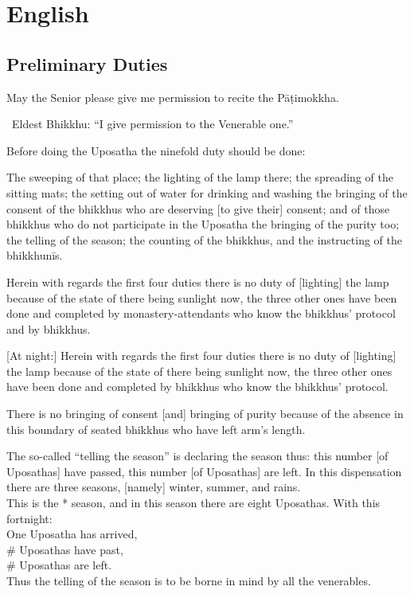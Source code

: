 
\chapter{English}

\clearpage

\section{Preliminary Duties}
\label{preliminary-duties}

\begin{center}
  May the Senior please give me permission to recite the Pāṭimokkha.
\end{center}

\begin{center}
  \anglebracketleft\ \hspace{-0.5mm}Eldest Bhikkhu: ``I give permission to the Venerable one.'' \hspace{-0.5mm}\anglebracketright\
\end{center}

Before doing the Uposatha the ninefold duty should be done:

The sweeping of that place; the lighting of the lamp there; the spreading of the sitting mats; the setting out of water for drinking and washing the bringing of the consent of the bhikkhus who are deserving [to give their] consent; and of those bhikkhus who do not participate in the Uposatha the bringing of the purity too; the telling of the season; the counting of the bhikkhus, and the instructing of the bhikkhunīs.

Herein with regards the first four duties there is no duty of [lighting] the lamp because of the state of there being sunlight now, the three other ones have been done and completed by monastery-attendants who know the bhikkhus' protocol and by bhikkhus.

[At night:] Herein with regards the first four duties there is no duty of [lighting] the lamp because of the state of there being sunlight now, the three other ones have been done and completed by bhikkhus who know the bhikkhus' protocol.

There is no bringing of consent [and] bringing of purity because of the absence in this boundary of seated bhikkhus who have left arm's length.

The so-called ``telling the season'' is declaring the season thus: this number [of Uposathas] have passed, this number [of Uposathas] are left. In this dispensation there are three seasons, [namely] winter, summer, and rains.\\
This is the * season, and in this season there are eight Uposathas. With this fortnight:\\
One Uposatha has arrived,\\
\# Uposathas have past,\\
\# Uposathas are left.\\
Thus the telling of the season is to be borne in mind by all the venerables.

